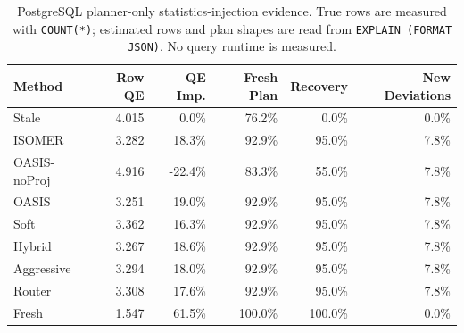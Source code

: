 \begin{table}[t]
  \centering
  \small
  \caption{PostgreSQL planner-only statistics-injection evidence. True rows are measured with \texttt{COUNT(*)}; estimated rows and plan shapes are read from \texttt{EXPLAIN (FORMAT JSON)}. No query runtime is measured.}
  \label{tab:postgres_planner_stats_injection}
  \setlength{\tabcolsep}{4pt}
  \begin{tabular}{lrrrrr}
    \toprule
    Method & Row QE & QE Imp. & Fresh Plan & Recovery & New Deviations \\
    \midrule
    Stale & 4.015 & 0.0\% & 76.2\% & 0.0\% & 0.0\% \\
    ISOMER & 3.282 & 18.3\% & 92.9\% & 95.0\% & 7.8\% \\
    OASIS-noProj & 4.916 & -22.4\% & 83.3\% & 55.0\% & 7.8\% \\
    OASIS & 3.251 & 19.0\% & 92.9\% & 95.0\% & 7.8\% \\
    Soft & 3.362 & 16.3\% & 92.9\% & 95.0\% & 7.8\% \\
    Hybrid & 3.267 & 18.6\% & 92.9\% & 95.0\% & 7.8\% \\
    Aggressive & 3.294 & 18.0\% & 92.9\% & 95.0\% & 7.8\% \\
    Router & 3.308 & 17.6\% & 92.9\% & 95.0\% & 7.8\% \\
    Fresh & 1.547 & 61.5\% & 100.0\% & 100.0\% & 0.0\% \\
    \bottomrule
  \end{tabular}
\end{table}
